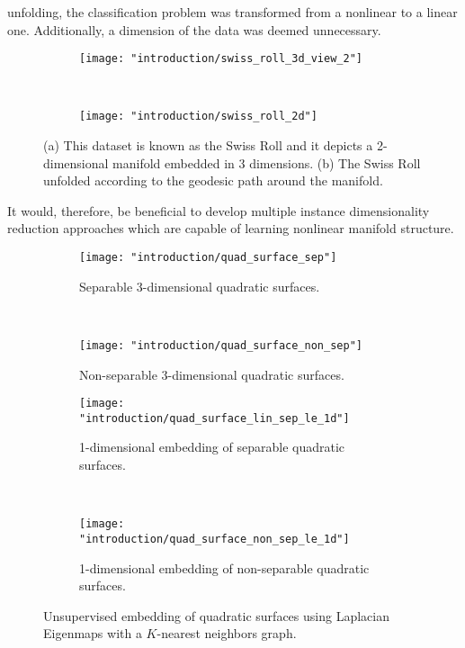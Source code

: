 unfolding, the classification problem was transformed from a nonlinear to a linear one.  Additionally, a dimension of the data was deemed unnecessary.
\begin{figure*}[t!]
	\centering
	\begin{subfigure}[t]{0.5\textwidth}
		\centering
		\texttt{[image: "introduction/swiss\_roll\_3d\_view\_2"]}
		\caption{}
		\label{fig:swiss_roll_3d}
	\end{subfigure}%
	~ 
	\begin{subfigure}[t]{0.5\textwidth}
		\centering
		\texttt{[image: "introduction/swiss\_roll\_2d"]}
		\caption{}
		\label{fig:swiss_roll_2d}
	\end{subfigure}
	\caption[Swiss Roll manifold unfolding.]{(a) This dataset is known as the Swiss Roll and it depicts a 2-dimensional manifold embedded in 3 dimensions.  (b) The Swiss Roll unfolded according to the geodesic path around the manifold.}
	\label{fig:swiss_roll}%
\end{figure*}  
It would, therefore, be beneficial to develop multiple instance dimensionality reduction approaches which are capable of learning nonlinear manifold structure.  

\begin{figure*}[t!]
	\centering
	\begin{subfigure}[t]{0.5\textwidth}
		\centering
		\texttt{[image: "introduction/quad\_surface\_sep"]}
		\caption{Separable 3-dimensional quadratic surfaces.}
		\label{fig:quad_surface_sep}
	\end{subfigure}%
	~ 
	\begin{subfigure}[t]{0.5\textwidth}
		\centering
		\texttt{[image: "introduction/quad\_surface\_non\_sep"]}
		\caption{Non-separable 3-dimensional quadratic surfaces.}
		\label{fig:quad_surface_non_sep}
	\end{subfigure}
	
	
	\begin{subfigure}[t]{0.5\textwidth}
		\centering
		\texttt{[image: "introduction/quad\_surface\_lin\_sep\_le\_1d"]}
		\caption{1-dimensional embedding of separable quadratic surfaces.}
		\label{fig:quad_surface_sep_le_1d}
	\end{subfigure}%
	~ 
	\begin{subfigure}[t]{0.5\textwidth}
		\centering
		\texttt{[image: "introduction/quad\_surface\_non\_sep\_le\_1d"]}
		\caption{1-dimensional embedding of non-separable quadratic surfaces.}
		\label{fig:quad_surface_non_sep_le_1d}
	\end{subfigure}
	\caption[Unsupervised embedding of quadratic surfaces]{Unsupervised embedding of quadratic surfaces using Laplacian Eigenmaps with a $K$-nearest neighbors graph.}
	\label{fig:quad_surfaces_no_labels}%
\end{figure*} 

